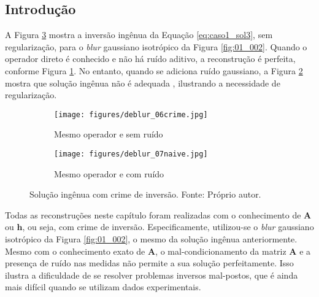 \subsection{Introdução}

 A Figura \ref{fig:01_005} mostra a inversão ingênua da Equação \eqref{eq:caso1_sol3}, sem regularização, para o \textit{blur} gaussiano isotrópico da Figura \ref{fig:01_002}. Quando o operador direto é conhecido e não há ruído aditivo, a reconstrução é perfeita, conforme Figura \ref{fig:01_005a}. No entanto, quando se adiciona ruído gaussiano, a Figura \ref{fig:01_005b} mostra que solução ingênua não é adequada \cite[pág. 5]{hansen2006deblurring}, ilustrando a necessidade de regularização. 


\begin{figure}[H]
     \centering
     \begin{subfigure}[b]{0.34\textwidth}
         \centering
         \texttt{[image: figures/deblur\_06crime.jpg]}
         \caption{Mesmo operador e sem ruído}
         \label{fig:01_005a}
     \end{subfigure}
     \begin{subfigure}[b]{0.34\textwidth}
         \centering
                  \texttt{[image: figures/deblur\_07naive.jpg]}
         \caption{Mesmo operador e com ruído}
         \label{fig:01_005b}
     \end{subfigure}
\caption[Solução ingênua com crime de inversão.]{Solução ingênua com crime de inversão. Fonte: Próprio autor.}
\label{fig:01_005}
\end{figure}


Todas as reconstruções neste capítulo foram realizadas com o conhecimento de $\mathbf{A}$ ou $\mathbf{h}$, ou seja, com crime de inversão. Especificamente, utilizou-se o \textit{blur} gaussiano isotrópico da Figura \ref{fig:01_002}, o mesmo da solução ingênua anteriormente. Mesmo com o conhecimento exato de $\mathbf{A}$, o mal-condicionamento da matriz $\mathbf{A}$ e a presença de ruído nas medidas não permite a sua solução perfeitamente. Isso ilustra a dificuldade de se resolver problemas inversos mal-postos, que é ainda mais difícil quando se utilizam dados experimentais. 

